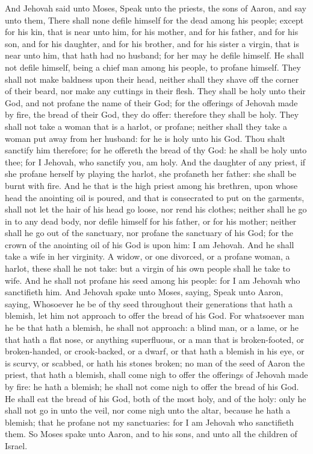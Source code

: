 And Jehovah said unto Moses, Speak unto the priests, the sons of Aaron, and say unto them, There shall none defile himself for the dead among his people; except for his kin, that is near unto him, for his mother, and for his father, and for his son, and for his daughter, and for his brother, and for his sister a virgin, that is near unto him, that hath had no husband; for her may he defile himself. He shall not defile himself, being a chief man among his people, to profane himself. They shall not make baldness upon their head, neither shall they shave off the corner of their beard, nor make any cuttings in their flesh. They shall be holy unto their God, and not profane the name of their God; for the offerings of Jehovah made by fire, the bread of their God, they do offer: therefore they shall be holy. They shall not take a woman that is a harlot, or profane; neither shall they take a woman put away from her husband: for he is holy unto his God. Thou shalt sanctify him therefore; for he offereth the bread of thy God: he shall be holy unto thee; for I Jehovah, who sanctify you, am holy. And the daughter of any priest, if she profane herself by playing the harlot, she profaneth her father: she shall be burnt with fire.  And he that is the high priest among his brethren, upon whose head the anointing oil is poured, and that is consecrated to put on the garments, shall not let the hair of his head go loose, nor rend his clothes; neither shall he go in to any dead body, nor defile himself for his father, or for his mother; neither shall he go out of the sanctuary, nor profane the sanctuary of his God; for the crown of the anointing oil of his God is upon him: I am Jehovah. And he shall take a wife in her virginity. A widow, or one divorced, or a profane woman, a harlot, these shall he not take: but a virgin of his own people shall he take to wife. And he shall not profane his seed among his people: for I am Jehovah who sanctifieth him.  And Jehovah spake unto Moses, saying, Speak unto Aaron, saying, Whosoever he be of thy seed throughout their generations that hath a blemish, let him not approach to offer the bread of his God. For whatsoever man he be that hath a blemish, he shall not approach: a blind man, or a lame, or he that hath a flat nose, or anything superfluous, or a man that is broken-footed, or broken-handed, or crook-backed, or a dwarf, or that hath a blemish in his eye, or is scurvy, or scabbed, or hath his stones broken; no man of the seed of Aaron the priest, that hath a blemish, shall come nigh to offer the offerings of Jehovah made by fire: he hath a blemish; he shall not come nigh to offer the bread of his God. He shall eat the bread of his God, both of the most holy, and of the holy: only he shall not go in unto the veil, nor come nigh unto the altar, because he hath a blemish; that he profane not my sanctuaries: for I am Jehovah who sanctifieth them. So Moses spake unto Aaron, and to his sons, and unto all the children of Israel. 


